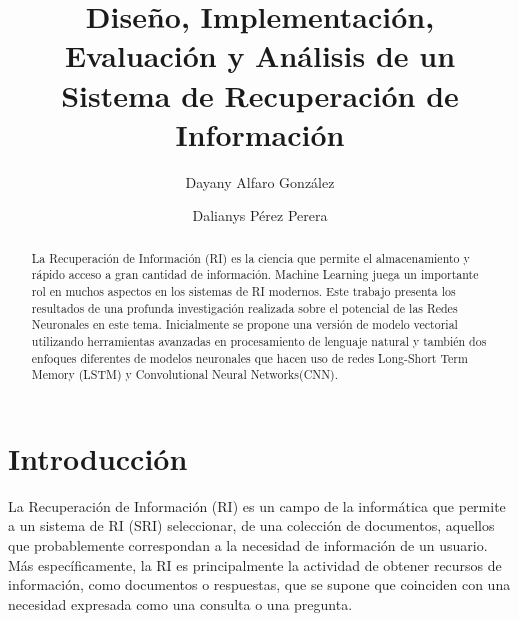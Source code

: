 \documentclass{llncs}
\begin{document}
%
%
\mainmatter              %
%
\title{ Diseño, Implementación,
	Evaluación y Análisis de un Sistema de Recuperación de Información}
%
%
\author{Dayany Alfaro González \and Dalianys Pérez Perera}
%
%
%
\institute{Universidad de La Habana, San Lázaro y L, Plaza de la Revolución, La Habana, Cuba%
}

\maketitle              %

\begin{abstract}
La Recuperación de Información (RI) es la ciencia que permite el almacenamiento y rápido acceso a gran cantidad de información. Machine Learning juega un importante rol en muchos aspectos en los sistemas de RI modernos. Este trabajo presenta los resultados de una profunda investigación realizada sobre el potencial de las Redes Neuronales en este tema. Inicialmente se propone una versión de modelo vectorial utilizando herramientas avanzadas en procesamiento de lenguaje natural y también dos enfoques diferentes de modelos neuronales que hacen uso de redes Long-Short Term Memory (LSTM) y Convolutional Neural Networks(CNN).


\end{abstract}
%
\section{Introducción}
%
La Recuperación de Información (RI) es un campo de la informática que permite a un sistema de RI (SRI) seleccionar, de una colección de documentos, aquellos que probablemente correspondan a la necesidad de información de un usuario. Más específicamente, la RI es principalmente la actividad de obtener recursos de información, como documentos o respuestas, que se supone que coinciden con una necesidad expresada como una consulta o una pregunta.
\end{document}

